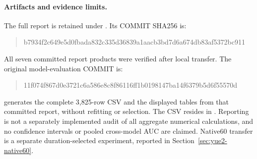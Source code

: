 \paragraph{Artifacts and evidence limits.}
The full report is retained under
. Its COMMIT SHA256 is:
\begin{quote}\scriptsize\ttfamily
b7934f2c649e5d0fbada832c335d36839a1aacb3bd7d6a674db83af5372bc911
\end{quote}
All seven committed report products were verified after local transfer.
The original model-evaluation COMMIT is:
\begin{quote}\scriptsize\ttfamily
11f074f867d0e3721c6a586e8c8f86116ff1b0198147ba14f6379b5d6f55570d
\end{quote}
 generates the complete 3,825-row
CSV and the displayed tables from that committed report, without refitting or
selection. The CSV resides in
. Reporting is not a
separately implemented audit of all aggregate numerical calculations, and no
confidence intervals or pooled cross-model AUC are claimed. Native60 transfer
is a separate duration-selected experiment, reported in Section~\ref{sec:yue2-native60}.
